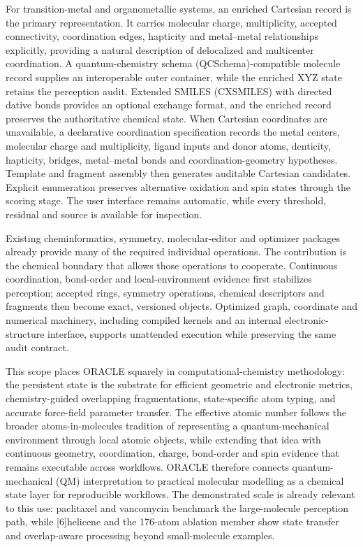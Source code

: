 \documentclass[journal=jctcce,manuscript=article]{achemso}
\begin{document}
For transition-metal and organometallic systems, an enriched Cartesian record
is the primary representation.  It carries molecular charge, multiplicity,
accepted connectivity, coordination edges, hapticity and metal--metal
relationships explicitly, providing a natural description of delocalized and
multicenter coordination.  A quantum-chemistry schema (QCSchema)-compatible
molecule record supplies an interoperable outer container, while the enriched XYZ state
retains the perception audit.  Extended SMILES (CXSMILES) with directed dative bonds provides an
optional exchange format, and the enriched record preserves the authoritative
chemical state.  When
Cartesian coordinates are unavailable, a declarative coordination
specification records the metal centers, molecular charge and multiplicity,
ligand inputs and donor atoms, denticity, hapticity, bridges, metal--metal
bonds and coordination-geometry hypotheses.  Template and fragment assembly
then generates auditable Cartesian candidates.  Explicit enumeration preserves
alternative oxidation and spin states through the scoring stage.  The user
interface remains automatic, while every threshold, residual and source is
available for inspection.

Existing cheminformatics, symmetry, molecular-editor and optimizer packages
already provide many of the required individual operations.\cite{rdkit_book_2026,
openbabel_2011,cdk_2017,symmetrizer_2012,beruski_symmetry_2014,
wang_song_2016} The contribution is the chemical boundary that allows those
operations to cooperate.  Continuous coordination, bond-order and
local-environment evidence first stabilizes perception; accepted rings,
symmetry operations, chemical descriptors and fragments then become exact,
versioned objects.  Optimized graph, coordinate and numerical machinery,
including compiled kernels and an internal electronic-structure interface,
supports unattended execution while preserving the same audit contract.

This scope places ORACLE squarely in computational-chemistry methodology: the
persistent state is the substrate for efficient geometric and electronic
metrics, chemistry-guided overlapping fragmentations, state-specific atom
typing, and accurate force-field parameter transfer.  The effective atomic
number follows the broader atoms-in-molecules tradition of representing a
quantum-mechanical environment through local atomic objects, while extending
that idea with continuous geometry, coordination, charge, bond-order and spin
evidence that remains executable across workflows.\cite{bader_1990_aim}
ORACLE therefore connects
quantum-mechanical (QM) interpretation to practical molecular modelling as a
chemical state layer for reproducible workflows.  The demonstrated scale is already relevant
to this use: paclitaxel and vancomycin benchmark the large-molecule perception
path, while [6]helicene and the 176-atom ablation member show state transfer
and overlap-aware processing beyond small-molecule examples.
\end{document}
